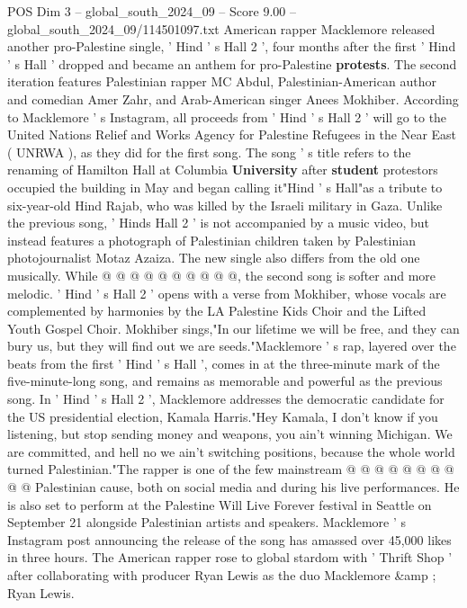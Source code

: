 \begin{textsample}{POS Dim 3 – global\_south\_2024\_09 – Score 9.00 – global\_south\_2024\_09/114501097.txt}  \label{ex:f3_pos_322}
American rapper Macklemore released another pro-Palestine single, ' Hind ' s Hall 2 ', four months after the first ' Hind ' s Hall ' dropped and became an anthem for pro-Palestine \textbf{protests}.
The second iteration features Palestinian rapper MC Abdul, Palestinian-American author and comedian Amer Zahr, and Arab-American singer Anees Mokhiber.
According to Macklemore ' s Instagram, all proceeds from ' Hind ' s Hall 2 ' will go to the United Nations Relief and Works Agency for Palestine Refugees in the Near East ( UNRWA ), as they did for the first song.
The song ' s title refers to the renaming of Hamilton Hall at Columbia \textbf{University} after \textbf{student} protestors occupied the building in May and began calling it"Hind ' s Hall"as a tribute to six-year-old Hind Rajab, who was killed by the Israeli military in Gaza.
Unlike the previous song, ' Hinds Hall 2 ' is not accompanied by a music video, but instead features a photograph of Palestinian children taken by Palestinian photojournalist Motaz Azaiza.
The new single also differs from the old one musically.
While @ @ @ @ @ @ @ @ @ @, the second song is softer and more melodic. ' Hind ' s Hall 2 ' opens with a verse from Mokhiber, whose vocals are complemented by harmonies by the LA Palestine Kids Choir and the Lifted Youth Gospel Choir.
Mokhiber sings,"In our lifetime we will be free, and they can bury us, but they will find out we are seeds."Macklemore ' s rap, layered over the beats from the first ' Hind ' s Hall ', comes in at the three-minute mark of the five-minute-long song, and remains as memorable and powerful as the previous song.
In ' Hind ' s Hall 2 ', Macklemore addresses the democratic candidate for the US presidential election, Kamala Harris."Hey Kamala, I don't know if you listening, but stop sending money and weapons, you ain't winning Michigan.
We are committed, and hell no we ain't switching positions, because the whole world turned Palestinian."The rapper is one of the few mainstream @ @ @ @ @ @ @ @ @ @ Palestinian cause, both on social media and during his live performances.
He is also set to perform at the Palestine Will Live Forever festival in Seattle on September 21 alongside Palestinian artists and speakers.
Macklemore ' s Instagram post announcing the release of the song has amassed over 45,000 likes in three hours.
The American rapper rose to global stardom with ' Thrift Shop ' after collaborating with producer Ryan Lewis as the duo Macklemore \&amp ; Ryan Lewis.

\end{textsample}
